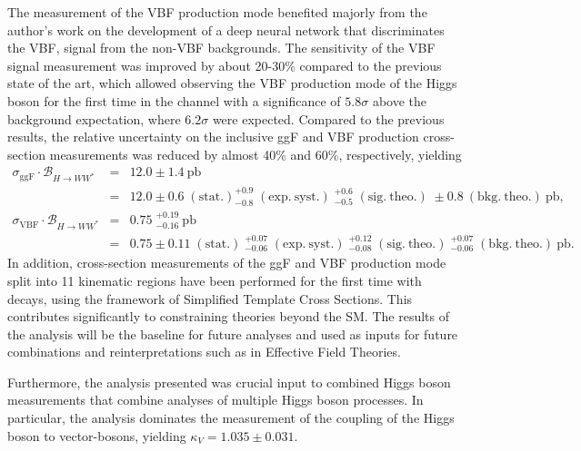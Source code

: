 The measurement of the VBF production mode benefited majorly from the author's work on the development of a deep neural network that discriminates the VBF, \HWW signal from the non-VBF backgrounds. 
The sensitivity of the VBF signal measurement was improved by about 20-30\% compared to the previous state of the art, which allowed observing the VBF production mode of the Higgs boson for the first time in the \HWW channel with a significance of $5.8\sigma$ above the background expectation, where $6.2\sigma$ were expected.
Compared to the previous \RunTwo results, the relative uncertainty on the inclusive ggF and VBF production cross-section measurements was reduced by almost 40\% and 60\%, respectively, yielding 
\begin{eqnarray*}
    \sigma_{\mathrm{ggF}} \cdot \mathcal{B}_{H \to WW^{\ast}} &=& 12.0 \pm 1.4~\mathrm{pb} \\
    &=& 12.0 \pm 0.6\;(\mathrm{stat.}) ^{+0.9}_{-0.8}\;(\mathrm{exp.~syst.})\;^{+0.6}_{-0.5}\;(\mathrm{sig.~theo.})\; \pm 0.8~(\mathrm{bkg.~theo.})~\mathrm{pb},  \\
    \sigma_{\mathrm{VBF}} \cdot \mathcal{B}_{H \to WW^{\ast}} &=& 0.75\;^{+0.19}_{-0.16}~\mathrm{pb} \\
    &=& 0.75 \pm 0.11\;(\mathrm{stat.})\;^{+0.07}_{-0.06}\;(\mathrm{exp.~syst.})\;^{+0.12}_{-0.08}\;(\mathrm{sig.~theo.})\;^{+0.07}_{-0.06}\;(\mathrm{bkg.~theo.})~\mathrm{pb}.
  \end{eqnarray*}
In addition, cross-section measurements of the ggF and VBF production mode split into 11 kinematic regions have been performed for the first time with \HWW decays, using the framework of Simplified Template Cross Sections. This contributes significantly to constraining theories beyond the SM. 
The results of the \HWW analysis will be the baseline for future analyses and used as inputs for future combinations and reinterpretations such as in Effective Field Theories. 

Furthermore, the analysis presented was crucial input to combined Higgs boson measurements that combine analyses of multiple Higgs boson processes. 
In particular, the \HWW analysis dominates the measurement of the coupling of the Higgs boson to vector-bosons, yielding $\kappa_V = 1.035 \pm 0.031$.


